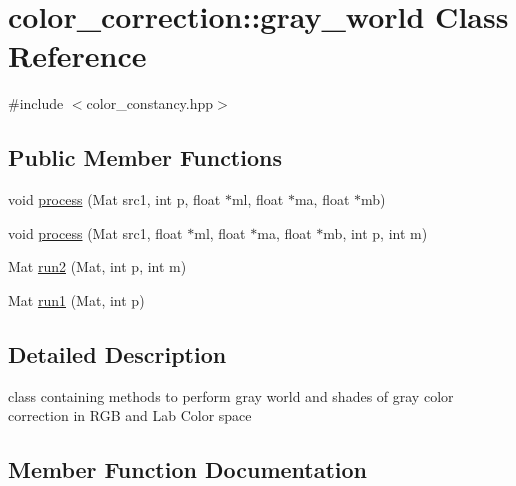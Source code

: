 \hypertarget{classcolor__correction_1_1gray__world}{}\section{color\+\_\+correction\+:\+:gray\+\_\+world Class Reference}
\label{classcolor__correction_1_1gray__world}


{\ttfamily \#include $<$color\+\_\+constancy.\+hpp$>$}

\subsection*{Public Member Functions}
\begin{DoxyCompactItemize}
\item 
void \hyperlink{classcolor__correction_1_1gray__world_a5d5afd72d6d11a1ea1e396b9a71da767}{process} (Mat src1, int p, float $\ast$ml, float $\ast$ma, float $\ast$mb)
\item 
void \hyperlink{classcolor__correction_1_1gray__world_a4a0d5ba6b9e4ae8d15a664f6e60b4a24}{process} (Mat src1, float $\ast$ml, float $\ast$ma, float $\ast$mb, int p, int m)
\item 
Mat \hyperlink{classcolor__correction_1_1gray__world_afe9a7e290fa94f8b0c5d67e88b4f206e}{run2} (Mat, int p, int m)
\item 
Mat \hyperlink{classcolor__correction_1_1gray__world_a5d522f9b4cbc22b417463e8542164364}{run1} (Mat, int p)
\end{DoxyCompactItemize}


\subsection{Detailed Description}
class containing methods to perform gray world and shades of gray color correction in R\+GB and Lab Color space 

\subsection{Member Function Documentation}
\mbox{\label{classcolor__correction_1_1gray__world_a5d5afd72d6d11a1ea1e396b9a71da767}} 
